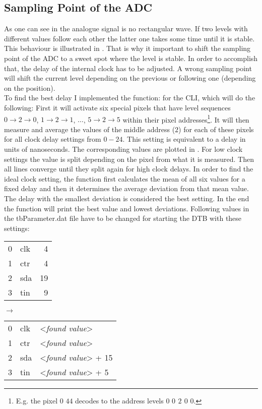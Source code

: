 \subsection{Sampling Point of the \ac{ADC}}
As one can see in  the analogue signal is no rectangular wave. If two levels with different values follow each other the latter one takes some time until it is stable. This behaviour is illustrated in . That is why it important to shift the sampling point of the \ac{ADC} to a sweet spot where the level is stable. In order to accomplish that, the delay of the internal clock has to be adjusted. A wrong sampling point will shift the current level depending on the previous or following one (depending on the position).\\
To find the best delay I implemented the function:
for the \ac{CLI}, which will do the following: First it will activate six special pixels that have level sequences $0\rightarrow 2 \rightarrow 0$, $1\rightarrow 2 \rightarrow 1$, $\hdots$, $5\rightarrow 2 \rightarrow 5$ within their pixel addresses\footnote{E.g. the pixel $0$ $44$ decodes to the address levels $0$ \textbf{$0$ $2$ $0$} $0$.}. It will then measure and average the values of the middle address ($2$) for each of these pixels for all clock delay settings from $0-24$. This setting is equivalent to a delay in units of nanoseconds. The corresponding values are plotted in . For low clock settings the value is split depending on the pixel from what it is measured. Then all lines converge until they split again for high clock delays. In order to find the ideal clock setting, the function first calculates the mean of all six values for a fixed delay and then it determines the average deviation from that mean value. The delay with the smallest deviation is considered the best setting. In the end the function will print the best value and lowest deviations. Following values in the tbParameter.dat file have to be changed for starting the \ac{DTB} with these settings:\s
{\ubuntu
\begin{tabular}{llr}
	0	&   clk	&  4\\
	1	&	ctr	&  4\\
	2	&	sda	&  19\\
	3	&	tin	&  9
\end{tabular}}
$\longrightarrow$
{\ubuntu
\begin{tabular}{lll}
	0	&   clk	&  <\textit{found value}>\\
	1	&	ctr	&  <\textit{found value}>\\
	2	&	sda	&  <\textit{found value}> + 15\\
	3	&	tin	&  <\textit{found value}> + 5
\end{tabular}}\no\s
